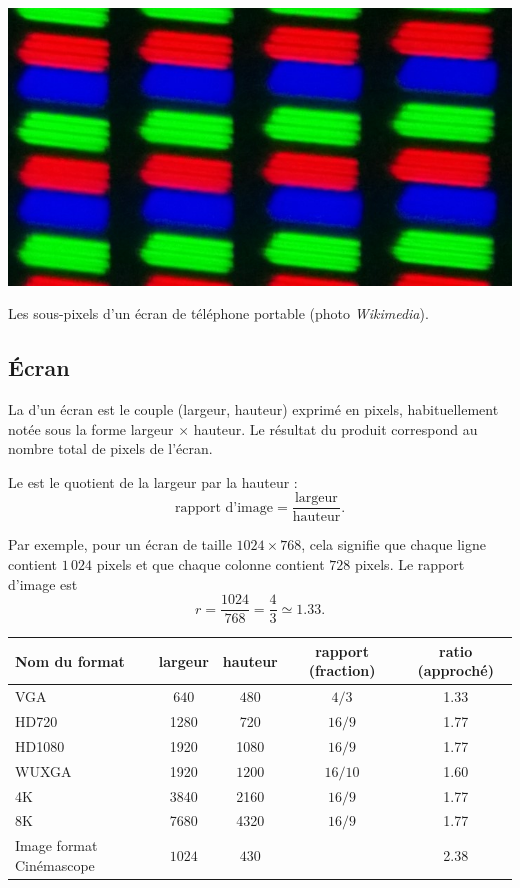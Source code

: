 \documentclass[11pt,class=report,crop=false]{standalone}
\begin{document}
\begin{center}
	\includegraphics[scale=\myscale,scale=0.25]{figures/sous-pixels}
	
	Les sous-pixels d'un écran de téléphone portable (photo \emph{Wikimedia}).
\end{center}

\subsection{Écran}

La  d'un écran est le couple (largeur, hauteur) exprimé en pixels, habituellement notée sous la forme largeur $\times$ hauteur. Le résultat du produit
correspond au nombre total de pixels de l'écran.




Le  est le quotient de la largeur par la hauteur :
$$\text{rapport d'image} = \frac{\text{largeur}}{\text{hauteur}}.$$

Par exemple, pour un écran de taille $1024 \times 768$, cela signifie que chaque ligne contient $1\,024$ pixels et que chaque colonne contient $728$ pixels. Le rapport d'image est
$$r = \frac{1024}{768} = \frac{4}{3} \simeq 1.33.$$

\begin{center}
\begin{tabular}{|l|c|c|c|c|} 
	\hline
	Nom du format & largeur & hauteur & rapport (fraction) & ratio (approché) \\ \hline \hline
	VGA & $640$ & $480$ & $4/3$ &  1.33 \\ \hline	
	HD720 & 1280 & 720 & $16/9$ & 1.77 \\ \hline 
	HD1080 & 1920 & 1080 & $16/9$ & 1.77 \\ \hline 	
	WUXGA & 1920 & $1200$ & $16/10$ & 1.60 \\ \hline 
	4K    & 3840 & 2160 & $16/9$ & 1.77 \\ \hline
	8K    & 7680 & 4320 & $16/9$ & 1.77 \\ \hline
	Image format Cinémascope & $1024$ & $430$ & & 2.38 \\ \hline  
\end{tabular}
\end{center}
\end{document}
